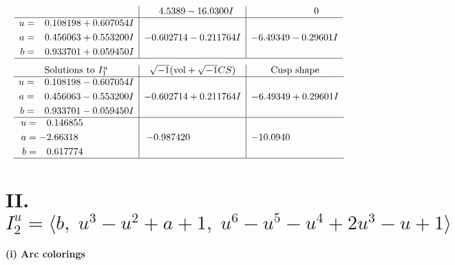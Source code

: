 \documentclass[1p]{elsarticle_modified}
\theoremstyle{definition}
\newcommand{\I}{\sqrt{-1}}
\begin{document}
$$\begin{array}{c|c|c}
 & \phantom{-}4.5389 - 16.0300 I & \phantom{-0.000000 } 0 \\ \hline\begin{aligned}
u &= \phantom{-}0.108198 + 0.607054 I \\
a &= \phantom{-}0.456063 + 0.553200 I \\
b &= \phantom{-}0.933701 + 0.059450 I\end{aligned}
 & -0.602714 - 0.211764 I & -6.49349 - 0.29601 I\\
 \hline 
 \end{array}$$\newpage$$\begin{array}{c|c|c}  
\text{Solutions to }I^u_{1}& \I (\text{vol} + \sqrt{-1}CS) & \text{Cusp shape}\\
 \hline 
\begin{aligned}
u &= \phantom{-}0.108198 - 0.607054 I \\
a &= \phantom{-}0.456063 - 0.553200 I \\
b &= \phantom{-}0.933701 - 0.059450 I\end{aligned}
 & -0.602714 + 0.211764 I & -6.49349 + 0.29601 I \\ \hline\begin{aligned}
u &= \phantom{-}0.146855\phantom{ +0.000000I} \\
a &= -2.66318\phantom{ +0.000000I} \\
b &= \phantom{-}0.617774\phantom{ +0.000000I}\end{aligned}
 & -0.987420\phantom{ +0.000000I} & -10.0940\phantom{ +0.000000I}\\
 \hline 
 \end{array}$$\newpage\newpage\renewcommand{\arraystretch}{1}
\centering \section*{II. $I^u_{2}= \langle b,\;u^3- u^2+a+1,\;u^6- u^5- u^4+2 u^3- u+1 \rangle$}
\flushleft \textbf{(i) Arc colorings}\\
\end{document}
